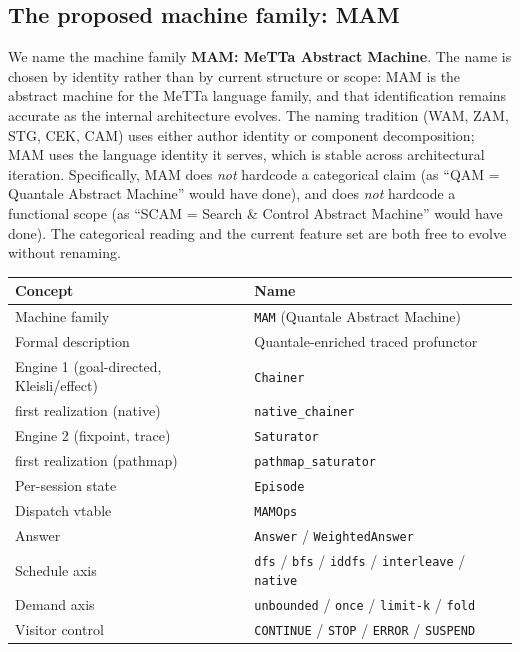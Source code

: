 \documentclass[11pt]{article}
\newcommand{\code}[1]{\texttt{#1}}
\begin{document}
\subsection{The proposed machine family: MAM}

We name the machine family \textbf{MAM: MeTTa Abstract Machine}.
The name is chosen by identity rather than by current structure or
scope: MAM is the abstract machine for the MeTTa language family,
and that identification remains accurate as the internal architecture
evolves.  The naming tradition (WAM, ZAM, STG, CEK, CAM) uses either
author identity or component decomposition; MAM uses the language
identity it serves, which is stable across architectural iteration.
Specifically, MAM does \emph{not} hardcode a categorical claim (as
``QAM = Quantale Abstract Machine'' would have done), and does
\emph{not} hardcode a functional scope (as ``SCAM = Search \& Control
Abstract Machine'' would have done).  The categorical reading and the
current feature set are both free to evolve without renaming.

\begin{center}
\begin{tabular}{ll}
\toprule
\textbf{Concept} & \textbf{Name} \\
\midrule
Machine family & \code{MAM} (Quantale Abstract Machine) \\
Formal description & Quantale-enriched traced profunctor \\
Engine 1 (goal-directed, Kleisli/effect) & \code{Chainer} \\
\quad first realization (native) & \code{native\_chainer} \\
Engine 2 (fixpoint, trace) & \code{Saturator} \\
\quad first realization (pathmap) & \code{pathmap\_saturator} \\
Per-session state & \code{Episode} \\
Dispatch vtable & \code{MAMOps} \\
Answer & \code{Answer} / \code{WeightedAnswer} \\
Schedule axis & \code{dfs} / \code{bfs} / \code{iddfs} / \code{interleave} / \code{native} \\
Demand axis & \code{unbounded} / \code{once} / \code{limit-k} / \code{fold} \\
Visitor control & \code{CONTINUE} / \code{STOP} / \code{ERROR} / \code{SUSPEND} \\
\bottomrule
\end{tabular}
\end{center}
\end{document}
